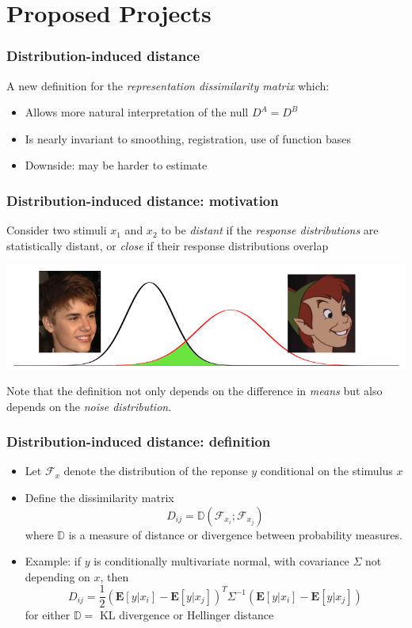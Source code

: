 \documentclass{beamer}
\newcommand{\E}{\textbf{E}}
\begin{document}
\section{Proposed Projects}

\begin{frame}
\frametitle{Distribution-induced distance}
A new definition for the \emph{representation dissimilarity matrix} which:
\begin{itemize}
\item Allows more natural interpretation of the null $D^A = D^B$
\item Is nearly invariant to smoothing, registration, use of function bases
\item Downside: may be harder to estimate
\end{itemize}
\end{frame}

\begin{frame}
\frametitle{Distribution-induced distance: motivation}
Consider two stimuli $x_1$ and $x_2$ to be \emph{distant} if the \emph{response distributions} are statistically distant,
or \emph{close} if their response distributions overlap
\begin{center}
\includegraphics[scale = 0.3]{similarity.png}
\end{center}
Note that the definition not only depends on the difference in \emph{means} but also depends on the \emph{noise distribution}.
\end{frame}

\begin{frame}
\frametitle{Distribution-induced distance: definition}
\begin{itemize}
\item Let $\mathcal{F}_x$ denote the distribution of the reponse $y$ conditional on the stimulus $x$
\item Define the dissimilarity matrix
\[
D_{ij} = \mathbb{D}(\mathcal{F}_{x_i}; \mathcal{F}_{x_j})
\]
where $\mathbb{D}$ is a measure of distance or divergence between probability measures.
\item Example: if $y$ is conditionally multivariate normal, with covariance $\Sigma$ not depending on $x$, then
\[
D_{ij} = \frac{1}{2}(\E[y|x_i] - \E[y|x_j])^T \Sigma^{-1} (\E[y|x_i] - \E[y|x_j])
\]
for either $\mathbb{D}=$ KL divergence or Hellinger distance
\end{itemize}
\end{frame}
\end{document}
